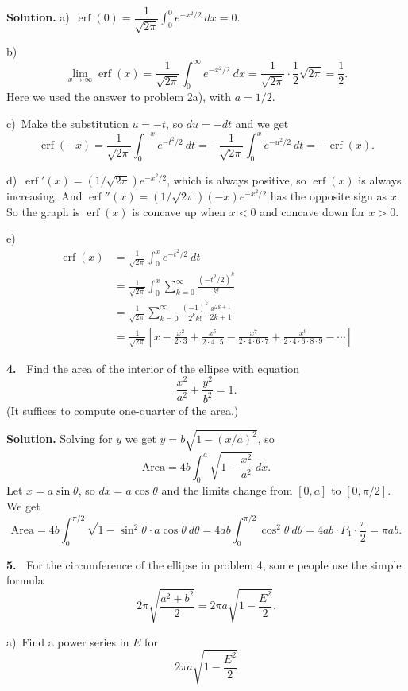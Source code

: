 \documentclass[12pt]{article}
\theoremstyle{definition}
\theoremstyle{remark}
\theoremstyle{definition}
\newenvironment{Solution}{\noindent\textbf{Solution.}}{}
\DeclareMathOperator{\erf}{erf}
\begin{document}
\begin{Solution} 
a)\ $\erf(0)=\dfrac{1}{\sqrt{2\pi}}\displaystyle\int_0^0 e^{-x^2/2}\ dx=0.$

b)\ 
\[\lim_{x\to\infty}\erf(x)
=\frac{1}{\sqrt{2\pi}}\int_0^\infty e^{-x^2/2}\ dx
=\frac{1}{\sqrt{2\pi}}\cdot\frac{1}{2}\sqrt{2\pi}=\frac{1}{2}.
\]
Here we used the answer to problem 2a), with $a=1/2$. 

c)\ Make the substitution $u=-t$, so $du=-dt$ and we get
\[\erf(-x)=\frac{1}{\sqrt{2\pi}}\int_0^{-x} e^{-t^2/2}\ dt
=
-\frac{1}{\sqrt{2\pi}}\int_0^{x} e^{-u^2/2}\ dt
=-\erf(x).
\]

d)\ $\erf'(x)=(1/\sqrt{2\pi})e^{-x^2/2}$, which is always positive, so $\erf(x)$ is always increasing. And 
$\erf''(x)=(1/\sqrt{2\pi})(-x)e^{-x^2/2}$ has the opposite sign as $x$. So the graph is $\erf(x)$ is concave up when $x<0$ and concave down for $x>0$. 
\end{Solution} 

e)\ 
\[\begin{split}
\erf(x)&=\frac{1}{\sqrt{2\pi}}\int_0^xe^{-t^2/2}\ dt\\
&=\frac{1}{\sqrt{2\pi}}
\int_0^x\sum_{k=0}^\infty\frac{(-t^2/2)^k}{k!}\\
&=\frac{1}{\sqrt{2\pi}}
\sum_{k=0}^\infty\frac{(-1)^k}{2^kk!}\frac{x^{2k+1}}{2k+1}\\
&=\frac{1}{\sqrt{2\pi}}\left[
x-\frac{x^2}{2\cdot 3}+\frac{x^5}{2\cdot 4\cdot 5}-\frac{x^7}{2\cdot 4\cdot 6\cdot 7}+\frac{x^9}{2\cdot 4\cdot 6\cdot 8\cdot 9}-\cdots
\right]
\end{split}
\]


{\bf 4.\ } Find the area of the interior of the ellipse with equation 
\[\frac{x^2}{a^2}+\frac{y^2}{b^2}=1.\]
(It suffices to compute one-quarter of the area.)

\begin{Solution} Solving for $y$ we get $y=b\sqrt{1-(x/a)^2}$, so 
\[\text{Area}=4b\int_0^a\sqrt{1-\frac{x^2}{a^2}}\ dx.\]
Let $x=a\sin\theta$, so $dx=a\cos\theta$ and the limits change from $[0,a]$ to $[0,\pi/2]$. We get 
\[\text{Area}
=4b\int_0^{\pi/2}\sqrt{1-\sin^2\theta}\cdot a\cos\theta\ d\theta
=4ab\int_0^{\pi/2}\cos^2\theta\ d\theta=
4ab\cdot P_1\cdot\frac{\pi}{2}=\pi ab.
\]
\end{Solution}

{\bf 5.\ } For the circumference of the ellipse in problem 4, some people use the simple formula 
\[
2\pi\sqrt{\frac{a^2+b^2}{2}}=2\pi a\sqrt{1-\frac{E^2}{2}}.
\]

a)\ Find a power series in $E$ for 
\[2\pi a\sqrt{1-\frac{E^2}{2}}\]
\end{document}
